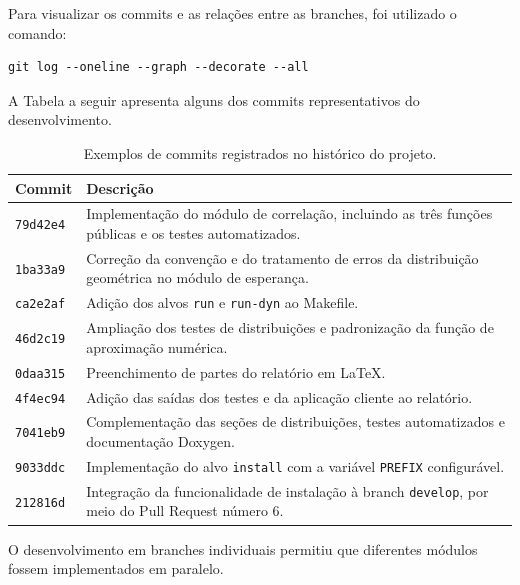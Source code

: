 \documentclass[12pt,a4paper]{article}
\newcommand{\cod}[1]{\texttt{#1}}
\begin{document}
Para visualizar os commits e as relações entre
as branches, foi utilizado o comando:

\begin{lstlisting}[style=shell]
git log --oneline --graph --decorate --all
\end{lstlisting}

A Tabela a seguir apresenta alguns dos commits
representativos do desenvolvimento.

\begin{table}[htbp]
\centering
\small
\begin{tabular}{@{}lp{10cm}@{}}
\toprule
Commit & Descrição \\
\midrule

\cod{79d42e4} &
Implementação do módulo de correlação, incluindo
as três funções públicas e os testes automatizados. \\

\cod{1ba33a9} &
Correção da convenção e do tratamento de erros
da distribuição geométrica no módulo de esperança. \\

\cod{ca2e2af} &
Adição dos alvos \cod{run} e \cod{run-dyn}
ao Makefile. \\

\cod{46d2c19} &
Ampliação dos testes de distribuições e
padronização da função de aproximação numérica. \\

\cod{0daa315} &
Preenchimento de partes do relatório em LaTeX. \\

\cod{4f4ec94} &
Adição das saídas dos testes e da aplicação
cliente ao relatório. \\

\cod{7041eb9} &
Complementação das seções de distribuições,
testes automatizados e documentação Doxygen. \\

\cod{9033ddc} &
Implementação do alvo \cod{install} com a
variável \cod{PREFIX} configurável. \\

\cod{212816d} &
Integração da funcionalidade de instalação
à branch \cod{develop}, por meio do
Pull Request número 6. \\

\bottomrule
\end{tabular}
\caption{Exemplos de commits registrados no
histórico do projeto.}
\end{table}

O desenvolvimento em branches individuais permitiu
que diferentes módulos fossem implementados em
paralelo.
\end{document}
